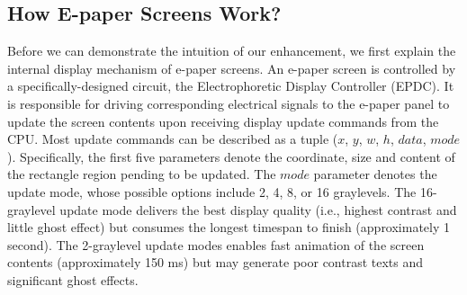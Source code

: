 \documentclass[]{sigchi}
\begin{document}





\subsection{How E-paper Screens Work?}
Before we can demonstrate the intuition of our enhancement, we first explain the internal display mechanism of e-paper screens.
An e-paper screen is controlled by a specifically-designed circuit, the Electrophoretic Display Controller (EPDC). It is responsible for driving corresponding electrical signals to the e-paper panel to update the screen contents upon receiving display update commands from the CPU. 
Most update commands can be described as a tuple ($x$, $y$, $w$, $h$, $data$, $mode$). Specifically, the first five parameters denote the coordinate, size and content of the rectangle region pending to be updated. The $mode$ parameter denotes the update mode, whose possible options include 2, 4, 8, or 16 graylevels. 
The 16-graylevel update mode delivers the best display quality (i.e., highest contrast and little ghost effect) but consumes the longest timespan to finish (approximately 1 second).
The 2-graylevel update modes enables fast animation of the screen contents (approximately 150 ms) but may generate poor contrast texts and significant ghost effects.
\end{document}
